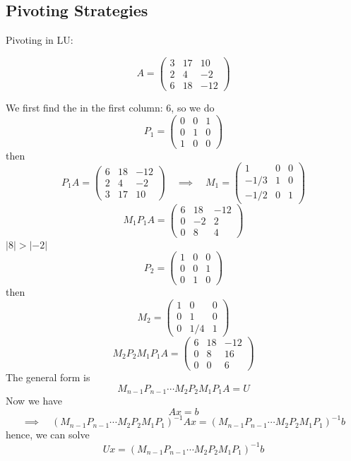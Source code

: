 \subsection{Pivoting Strategies}

Pivoting in LU: 

\begin{eg}
    \[
        A = \begin{pmatrix}
            3 & 17 & 10\\
            2& 4 & -2\\
            6 & 18 & -12
        \end{pmatrix}
    \]
\end{eg}

We first find the  in the first column: 6, so we do \[
    P_1 = \begin{pmatrix}
        0 & 0 & 1 \\
        0 & 1 & 0 \\
        1 & 0 & 0
    \end{pmatrix}
\]
then \[
    P_1 A = \begin{pmatrix}
        6 & 18 & -12 \\
        2 & 4 & -2 \\
        3 & 17 & 10
    \end{pmatrix} \quad \implies \quad M_1 = \begin{pmatrix}
        1 & 0 & 0 \\
        -1/3 & 1 & 0 \\
        -1/2 & 0 & 1
    \end{pmatrix}
\]
\[
    M_1 P_1 A = \begin{pmatrix}
        6 & 18 & -12 \\
        0 & -2 & 2 \\
        0 & 8 & 4
    \end{pmatrix}
\]
$|8| > |-2|$ \[
    P_2 = \begin{pmatrix}
        1 & 0 & 0 \\
        0 & 0 & 1 \\
        0 & 1 & 0
    \end{pmatrix}
\]
then \[
    M_2 = \begin{pmatrix}
        1 & 0 & 0 \\
        0 & 1 & 0 \\
        0 & 1/4 & 1
    \end{pmatrix}
\]
\[
    M_2 P_2 M_1 P_1 A = \begin{pmatrix}
        6 & 18 & -12 \\
        0 & 8 & 16 \\
        0 & 0 & 6
    \end{pmatrix}
\]
The general form is \[
    M_{n-1} P_{n-1} \cdots M_2 P_2 M_1 P_1 A = U
\]
Now we have \[
    Ax = b
\]
\[
    \implies \quad (M_{n-1} P_{n-1} \cdots M_2 P_2 M_1 P_1)^{-1} A x = (M_{n-1} P_{n-1} \cdots M_2 P_2 M_1 P_1)^{-1} b
\]
hence, we can solve \[
    Ux = (M_{n-1} P_{n-1} \cdots M_2 P_2 M_1 P_1)^{-1} b
\]

